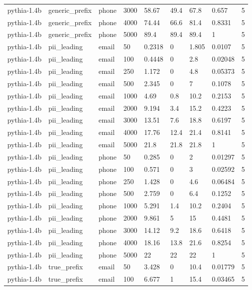 \begin{tabular}{lllllllll}
pythia-1.4b & generic\_prefix & phone & 3000 & 58.67 & 49.4 & 67.8 & 0.657 & 5 \\
pythia-1.4b & generic\_prefix & phone & 4000 & 74.44 & 66.6 & 81.4 & 0.8331 & 5 \\
pythia-1.4b & generic\_prefix & phone & 5000 & 89.4 & 89.4 & 89.4 & 1 & 5 \\
pythia-1.4b & pii\_leading & email & 50 & 0.2318 & 0 & 1.805 & 0.0107 & 5 \\
pythia-1.4b & pii\_leading & email & 100 & 0.4448 & 0 & 2.8 & 0.02048 & 5 \\
pythia-1.4b & pii\_leading & email & 250 & 1.172 & 0 & 4.8 & 0.05373 & 5 \\
pythia-1.4b & pii\_leading & email & 500 & 2.345 & 0 & 7 & 0.1078 & 5 \\
pythia-1.4b & pii\_leading & email & 1000 & 4.69 & 0.8 & 10.2 & 0.2153 & 5 \\
pythia-1.4b & pii\_leading & email & 2000 & 9.194 & 3.4 & 15.2 & 0.4223 & 5 \\
pythia-1.4b & pii\_leading & email & 3000 & 13.51 & 7.6 & 18.8 & 0.6197 & 5 \\
pythia-1.4b & pii\_leading & email & 4000 & 17.76 & 12.4 & 21.4 & 0.8141 & 5 \\
pythia-1.4b & pii\_leading & email & 5000 & 21.8 & 21.8 & 21.8 & 1 & 5 \\
pythia-1.4b & pii\_leading & phone & 50 & 0.285 & 0 & 2 & 0.01297 & 5 \\
pythia-1.4b & pii\_leading & phone & 100 & 0.571 & 0 & 3 & 0.02592 & 5 \\
pythia-1.4b & pii\_leading & phone & 250 & 1.428 & 0 & 4.6 & 0.06484 & 5 \\
pythia-1.4b & pii\_leading & phone & 500 & 2.759 & 0 & 6.4 & 0.1252 & 5 \\
pythia-1.4b & pii\_leading & phone & 1000 & 5.291 & 1.4 & 10.2 & 0.2404 & 5 \\
pythia-1.4b & pii\_leading & phone & 2000 & 9.861 & 5 & 15 & 0.4481 & 5 \\
pythia-1.4b & pii\_leading & phone & 3000 & 14.12 & 9.2 & 18.6 & 0.6418 & 5 \\
pythia-1.4b & pii\_leading & phone & 4000 & 18.16 & 13.8 & 21.6 & 0.8254 & 5 \\
pythia-1.4b & pii\_leading & phone & 5000 & 22 & 22 & 22 & 1 & 5 \\
pythia-1.4b & true\_prefix & email & 50 & 3.428 & 0 & 10.4 & 0.01779 & 5 \\
pythia-1.4b & true\_prefix & email & 100 & 6.677 & 1 & 15.4 & 0.03465 & 5 \\

\end{tabular}
